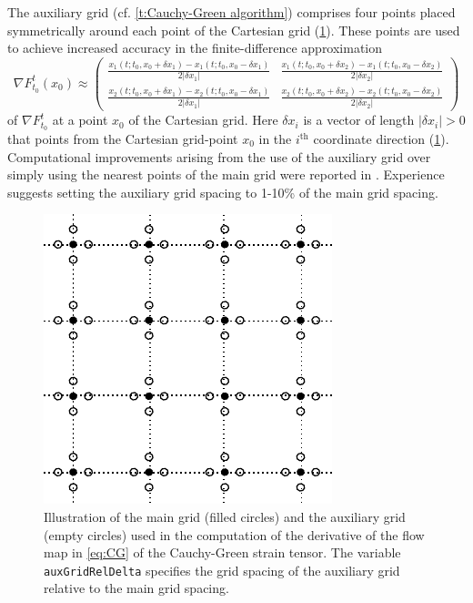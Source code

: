 \documentclass{elsarticle}
\begin{document}
The auxiliary grid (cf. \cref{t:Cauchy-Green algorithm}) comprises four points placed symmetrically around each point of the Cartesian grid (\cref{f:main and auxiliary grids}). These points are used to achieve increased accuracy in the finite-difference approximation
\[
\nabla F_{t_0}^t(x_0) \approx
\left(\begin{array}{cc}
\frac{x_1(t;t_0,x_0 + \delta x_1) - x_1(t;t_0,x_0 - \delta x_1)}{2\vert\delta x_1\vert} & \frac{x_1(t;t_0,x_0+\delta x_2) - x_1(t;t_0,x_0-\delta x_2)}{2\vert\delta x_2\vert}\\
\frac{x_2(t;t_0,x_0+\delta x_1) - x_2(t;t_0,x_0 - \delta x_1)}{2\vert\delta x_1\vert} & \frac{x_2(t;t_0,x_0 + \delta x_2) - x_2(t;t_0,x_0 - \delta x_2)}{2\vert\delta x_2\vert}
\end{array}\right)
\]
of $\nabla F_{t_0}^t$ at a point $x_0$ of the Cartesian grid. Here $\delta x_i$ is a vector of length $\vert\delta x_i\vert > 0$ that points from the Cartesian grid-point $x_0$ in the $i^\text{th}$ coordinate direction (\cref{f:main and auxiliary grids}). Computational improvements arising from the use of the auxiliary grid over simply using the nearest points of the main grid were reported in \citet{farazmand12:_comput_lagran}. Experience suggests setting the auxiliary grid spacing to 1-10\% of the main grid spacing.

\begin{figure}
\begin{center}
\includegraphics[width=.5\textwidth]{graphics/main_aux_grids}
\end{center}
\caption{Illustration of the main grid (filled circles) and the auxiliary grid (empty circles) used in the computation of the derivative of the flow map in \cref{eq:CG} of the Cauchy-Green strain tensor. The variable \lstinline!auxGridRelDelta! specifies the grid spacing of the auxiliary grid relative to the main grid spacing.}
\label{f:main and auxiliary grids}
\end{figure}
\end{document}
